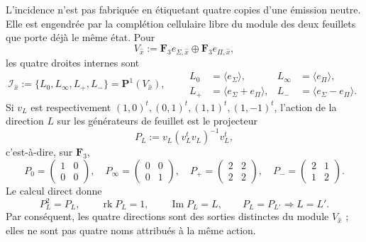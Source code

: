 L'incidence n'est pas fabriquée en étiquetant quatre copies d'une émission neutre. Elle est engendrée par la complétion cellulaire libre du module des deux feuillets que porte déjà le même état. Pour
\[
 V_{\widehat x}:=\mathbf F_3e_{\Sigma,\widehat x}
 \oplus\mathbf F_3e_{\Pi,\widehat x},
\]
les quatre droites internes sont
\begin{equation}
\label{eq:pdfv2-cor-cuatro-rectas-tpk}
 \mathscr I_{\widehat x}:=
 \{L_0,L_\infty,L_+,L_-\}
 =\mathbf P^1(V_{\widehat x}),\qquad
 \begin{aligned}
 L_0&=\langle e_\Sigma\rangle,&
 L_\infty&=\langle e_\Pi\rangle,\\
 L_+&=\langle e_\Sigma+e_\Pi\rangle,&
 L_-&=\langle e_\Sigma-e_\Pi\rangle.
 \end{aligned}
\end{equation}
Si \(v_L\) est respectivement \((1,0)^t,(0,1)^t,(1,1)^t,(1,-1)^t\), l'action de la direction \(L\) sur les générateurs de feuillet est le projecteur
\begin{equation}
\label{eq:pdfv2-cor-proyectores-cuatro-direcciones}
 P_L:=v_L(v_L^tv_L)^{-1}v_L^t,
\end{equation}
c'est-à-dire, sur \(\mathbf F_3\),
\[
 P_0=\begin{pmatrix}1&0\\0&0\end{pmatrix},\quad
 P_\infty=\begin{pmatrix}0&0\\0&1\end{pmatrix},\quad
 P_+=\begin{pmatrix}2&2\\2&2\end{pmatrix},\quad
 P_-=\begin{pmatrix}2&1\\1&2\end{pmatrix}.
\]
Le calcul direct donne
\begin{equation}
\label{eq:pdfv2-cor-proyectores-no-colapso}
 P_L^2=P_L,\qquad \operatorname{rk}P_L=1,\qquad
 \operatorname{Im}P_L=L,\qquad
 P_L=P_{L'}\Longrightarrow L=L'.
\end{equation}
Par conséquent, les quatre directions sont des sorties distinctes du module \(V_{\widehat x}\) ; elles ne sont pas quatre noms attribués à la même action.

